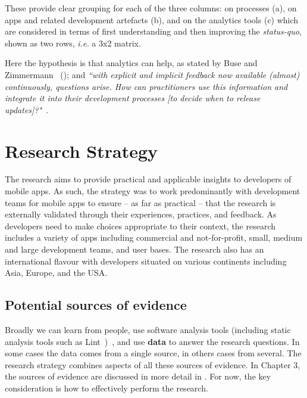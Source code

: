 These provide clear grouping for each of the three columns: on processes (a), on apps and related development artefacts (b), and on the analytics tools (c) which are considered in terms of first understanding and then improving the \emph{status-quo}, shown as two rows, \emph{i.e.} a 3x2 matrix. 


Here the hypothesis is that analytics can help, as stated by Buse and Zimmermann ~(\citeyear{buse_analytics_2010}); and \emph{``with explicit and implicit feedback now available (almost) continuously, questions arise. How can practitioners use this information and integrate it into their development processes [to decide when to release updates]?"}~.

\section{Research Strategy}
The research aims to provide practical and applicable insights to developers of mobile apps. As such, the strategy was to work predominantly with development teams for mobile apps to ensure -- as far as practical -- that the research is externally validated through their experiences, practices, and feedback. As developers need to make choices appropriate to their context, the research includes a variety of apps including commercial and not-for-profit, small, medium and large development teams, and user bases. The research also has an international flavour with developers situated on various continents including Asia, Europe, and the USA.

\subsection{Potential sources of evidence}
Broadly we can learn from people, use software analysis tools (including static analysis tools such as Lint~)~, and use \textbf{data} to answer the research questions. In some cases the data comes from a single source, in others cases from several. The research strategy combines aspects of all these sources of evidence. In Chapter 3, the sources of evidence are discussed in more detail in \href{sec:potential-sources-of-evidence}{}. For now, the key consideration is how to effectively perform the research.

